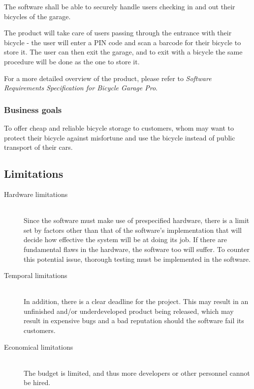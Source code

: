 \documentclass[12pt,titlepage]{article}
\begin{document}
The software shall be able to securely handle users checking in and out their
bicycles of the garage. 

The product will take care of users passing through the entrance with their
bicycle - the user will enter a PIN code and scan a barcode for their bicycle to
store it. The user can then exit the garage, and to exit with a bicycle the same
procedure will be done as the one to store it.

For a more detailed overview of the product, please refer to \textit{Software
Requirements Specification for Bicycle Garage Pro}.

\subsubsection{Business goals}

To offer cheap and reliable bicycle storage to customers, whom may want to
protect their bicycle against misfortune and use the bicycle instead of public
transport of their cars.

\subsection{Limitations}

\begin{description}
\item[Hardware limitations] \hfill \\ 
Since the software must make use of prespecified hardware, there is a limit set
by factors other than that of the software's implementation that will decide
how effective the system will be at doing its job. If there are fundamental
flaws in the hardware, the software too will suffer. To counter this potential
issue, thorough testing must be implemented in the software.

\item[Temporal limitations] \hfill \\
In addition, there is a clear deadline for the project. This may result in an
unfinished and/or underdeveloped product being released, which may result in
expensive bugs and a bad reputation should the software fail its customers.

\item[Economical limitations] \hfill \\
The budget is limited, and thus more developers or other personnel cannot be
hired.
\end{description}
\end{document}
